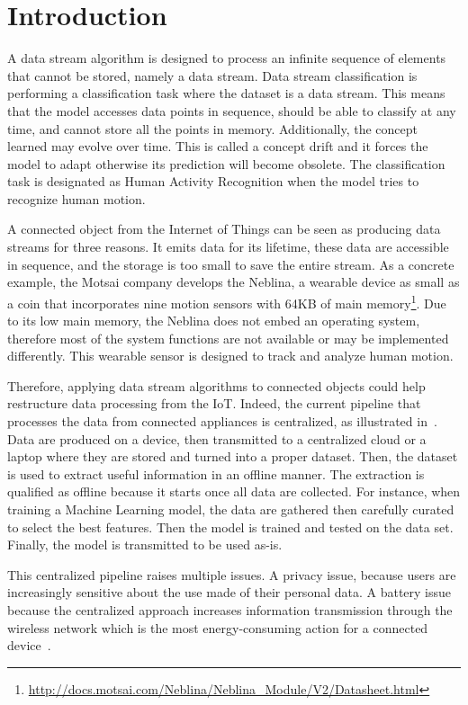 \section{Introduction}
\label{sec:introduction}
A data stream algorithm is designed to process an infinite sequence of elements
that cannot be stored, namely a data stream. Data stream classification is
performing a classification task where the dataset is a data stream. This means
that the model accesses data points in sequence, should be able to classify at
any time, and cannot store all the points in memory. Additionally, the concept
learned may evolve over time. This is called a concept drift and it forces the
model to adapt otherwise its prediction will become obsolete.  The
classification task is designated as Human Activity Recognition when the model
tries to recognize human motion.

A connected object from the Internet of Things can
be seen as producing data streams for three
reasons. It emits data for its lifetime, these
data are accessible in sequence, and the storage
is too small to save the entire stream.  As a
concrete example, the Motsai company develops the
Neblina, a wearable device as small as a coin that
incorporates nine motion sensors with 64KB of main
memory\footnote{\url{http://docs.motsai.com/Neblina/Neblina_Module/V2/Datasheet.html}}.
Due to its low main memory, the Neblina does not
embed an operating system, therefore most of the
system functions are not available or may be
implemented differently.  This wearable sensor is
designed to track and analyze human motion.

Therefore, applying data stream algorithms to connected objects could help
restructure data processing from the IoT.  Indeed, the current pipeline that
processes the data from connected appliances is centralized, as illustrated
in~\cite{recofit}.  Data are produced on a device, then transmitted to a
centralized cloud or a laptop where they are stored and turned into a proper
dataset. Then, the dataset is used to extract useful information in an offline
manner.  The extraction is qualified as offline because it starts once all data
are collected. For instance, when training a Machine Learning model, the data
are gathered then carefully curated to select the best features. Then the model
is trained and tested on the data set. Finally, the model is transmitted to be
used as-is.

This centralized pipeline raises multiple issues.  A privacy issue, because
users are increasingly sensitive about the use made of their personal data.  A
battery issue because the centralized approach increases information
transmission through the wireless network which is the most energy-consuming
action for a connected device~\cite{sensor-network-survey,
sensor-energy-model}.

